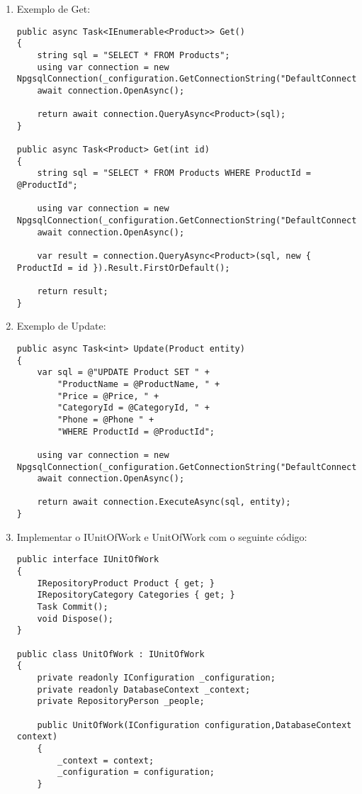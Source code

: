 \documentclass{article}
\begin{document}
\begin{enumerate}
    \item Exemplo de Get:
    \begin{verbatim}
public async Task<IEnumerable<Product>> Get()
{
    string sql = "SELECT * FROM Products";
    using var connection = new NpgsqlConnection(_configuration.GetConnectionString("DefaultConnection"));
    await connection.OpenAsync();

    return await connection.QueryAsync<Product>(sql);
}

public async Task<Product> Get(int id)
{
    string sql = "SELECT * FROM Products WHERE ProductId = @ProductId";

    using var connection = new NpgsqlConnection(_configuration.GetConnectionString("DefaultConnection"));
    await connection.OpenAsync();

    var result = connection.QueryAsync<Product>(sql, new { ProductId = id }).Result.FirstOrDefault();

    return result;
}
    \end{verbatim}

    \item Exemplo de Update:
    \begin{verbatim}
public async Task<int> Update(Product entity)
{
    var sql = @"UPDATE Product SET " +
        "ProductName = @ProductName, " +
        "Price = @Price, " +
        "CategoryId = @CategoryId, " +
        "Phone = @Phone " +
        "WHERE ProductId = @ProductId";

    using var connection = new NpgsqlConnection(_configuration.GetConnectionString("DefaultConnection"));
    await connection.OpenAsync();

    return await connection.ExecuteAsync(sql, entity);
}
    \end{verbatim}
    
    \item Implementar o IUnitOfWork e UnitOfWork com o seguinte código:
    
    \begin{verbatim}
public interface IUnitOfWork
{
    IRepositoryProduct Product { get; }
    IRepositoryCategory Categories { get; }
    Task Commit();
    void Dispose();
}

public class UnitOfWork : IUnitOfWork
{
    private readonly IConfiguration _configuration;
    private readonly DatabaseContext _context;
    private RepositoryPerson _people;

    public UnitOfWork(IConfiguration configuration,DatabaseContext context)
    {
        _context = context;
        _configuration = configuration;
    }


\end{verbatim}
\end{enumerate}
\end{document}
